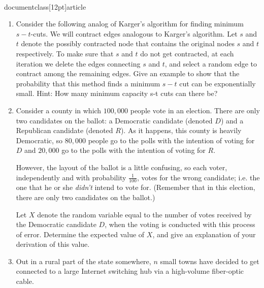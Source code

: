 \\documentclass[12pt]{article}
\begin{document}
\begin{enumerate}

\item 

Consider the following analog of Karger's algorithm for finding 
minimum $s-t$-cuts. We will contract edges analogous to Karger's 
algorithm. Let $s$ and $t$ denote the possibly contracted 
node that contains the original nodes $s$ and $t$ 
respectively. To make sure that $s$ and $t$ do 
not get contracted, at each iteration we delete the 
edges connecting $s$ and $t$, and select a random 
edge to contract among the remaining edges. Give an 
example to show that the probability that this method 
finds a minimum $s-t$ cut can be exponentially small. 
Hint: How many minimum capacity s-t cuts can there 
be?         


\item 

Consider a county in which $100,000$ people
vote in an election.
There are only two candidates on the ballot:
a Democratic candidate (denoted $D$) and
a Republican candidate (denoted $R$).
As it happens, this county is heavily Democratic,
so $80,000$ people go to the polls with the intention
of voting for $D$ and $20,000$
go to the polls with the intention of voting for $R$.

However, the layout of the ballot is a little confusing,
so each voter, independently and with probability $\frac{1}{100}$,
votes for the wrong candidate; i.e. the one that he or she
{\em didn't} intend to vote for.
(Remember that in this election, there are only
two candidates on the ballot.)

Let $X$ denote the random variable equal to the
number of votes received by the Democratic candidate $D$,
when the voting is conducted with this process of error.
Determine the expected value of $X$, and give
an explanation of your derivation of this value.



\item


Out in a rural part of the state somewhere,
$n$ small towns have decided to get connected
to a large Internet switching hub via
a high-volume fiber-optic cable.

\begin{figure}[h]
\begin{center}


\end{center}
\end{figure}
\end{enumerate}
\end{document}
